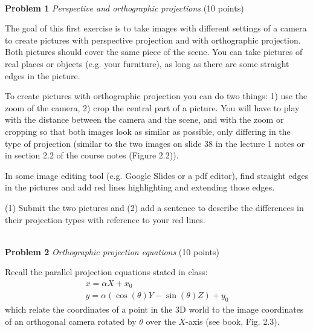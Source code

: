 \documentclass[11pt]{article}
\newcommand{\hwproblem}[2] {\noindent \\ {\bf #1} {\it #2}}
\begin{document}
\newpage

\hwproblem{Problem 1}{Perspective and orthographic projections} (10 points)

The goal of this first exercise is to take images with different settings of a camera to create pictures with perspective projection and with orthographic projection. Both pictures should cover the same piece of the scene. You can take pictures of real places or objects (e.g. your furniture), as long as there are some straight edges in the picture.%

To create pictures with orthographic projection you can do two things: 1) use the zoom of the camera, 2) crop the central part of a picture. You will have to play with the distance between the camera and the scene, and with the zoom or cropping so that both images look as similar as possible, only differing in the type of projection (similar to the two images on slide 38 in the lecture 1 notes or in section 2.2 of the course notes (Figure 2.2)).

In some image editing tool (e.g. Google Slides or a pdf editor), find straight edges in the pictures and add red lines highlighting and extending those edges.

(1) Submit the two pictures and (2) add a sentence to describe the differences in their projection types with reference to your red lines.

\hwproblem{Problem 2}{Orthographic projection equations} (10 points)

Recall the parallel projection equations stated in class:
\begin{gather}
    x = \alpha  X + x_0\\
    y = \alpha (\cos(\theta)Y - \sin(\theta)Z) +y_{0}
\end{gather}
which relate the coordinates of a point in the 3D world to the image coordinates of an orthogonal camera rotated by $\theta$ over the $X$-axis (see book, Fig. 2.3).
\end{document}
